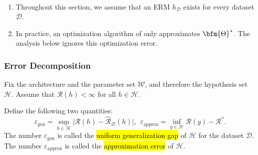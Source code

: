 \begin{note}$~$
\begin{enumerate}
\item Throughout this section, we assume that an ERM $h_{\mathcal{D}}$ exists for every dataset $\mathcal{D}$.\medskip
\item In practice, an optimization algorithm of  only approximates $\bfm{\Theta}^*$.  The analysis below ignores this optimization error.
\end{enumerate}
\end{note}
\subsubsection{Error Decomposition}
Fix the architecture and the parameter set $\mathcal{W}$, and therefore the hypothesis set $\mathcal{H}$.  Assume that $\mathcal{R}(h)<\infty$ for all $h\in \mathcal{H}$.

Define the following two quantities:
\begin{equation}
\varepsilon_\text{gen} = \sup_{h\in\mathcal{H}} \big|\mathcal{R}(h)-\widehat{\mathcal{R}}_{\mathcal{D}}(h)\big|,
~~
\varepsilon_\text{approx} = \inf_{g\in\mathcal{H}} \mathcal{R}(g) - \mathcal{R}^*.
\label{generalization.approximation.errors.eq}
\end{equation}
The number $\varepsilon_\text{gen}$ is called the \hl{uniform generalization gap} of $\mathcal{H}$ for the dataset $\mathcal{D}$.  The number $\varepsilon_\text{approx}$ is called the \hl{approximation error} of $\mathcal{H}$.  


